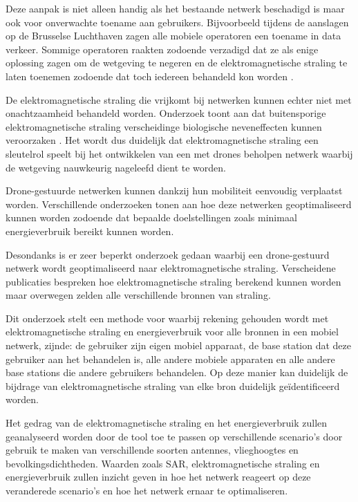 \documentclass[twocolumn]{phdsymp} %
\begin{document}
Deze aanpak is niet alleen handig als het bestaande netwerk beschadigd is maar ook voor onverwachte toename aan gebruikers.
Bijvoorbeeld tijdens de aanslagen op de Brusselse Luchthaven zagen alle mobiele operatoren een toename in data verkeer.
Sommige operatoren raakten zodoende verzadigd dat ze als enige oplossing zagen om de wetgeving te negeren en de 
elektromagnetische straling te laten toenemen zodoende dat toch iedereen behandeld kon worden \cite{baseZaventem}.

De elektromagnetische straling die vrijkomt bij netwerken kunnen echter niet met onachtzaamheid behandeld worden.
Onderzoek toont aan dat buitensporige elektromagnetische straling verscheidinge biologische neveneffecten kunnen veroorzaken \cite{bioeffects,WHO}.
Het wordt dus duidelijk dat elektromagnetische straling een sleutelrol speelt bij het ontwikkelen van een met drones beholpen netwerk 
waarbij de wetgeving nauwkeurig nageleefd dient te worden.

Drone-gestuurde netwerken kunnen dankzij hun mobiliteit eenvoudig verplaatst worden. Verschillende onderzoeken 
tonen aan hoe deze netwerken geoptimaliseerd kunnen worden zodoende dat bepaalde doelstellingen zoals minimaal energieverbruik
bereikt kunnen worden.

Desondanks is er zeer beperkt onderzoek gedaan waarbij een drone-gestuurd netwerk wordt geoptimaliseerd naar elektromagnetische straling.
Verscheidene publicaties bespreken hoe elektromagnetische straling berekend kunnen worden maar 
overwegen zelden alle verschillende bronnen van straling.

Dit onderzoek stelt een methode voor waarbij rekening gehouden wordt met 
elektromagnetische straling en energieverbruik voor alle bronnen in een mobiel netwerk, zijnde: de gebruiker zijn eigen 
mobiel apparaat, de base station dat deze gebruiker aan het behandelen is, alle andere mobiele apparaten en 
alle andere base stations die andere gebruikers behandelen. Op deze manier kan duidelijk de bijdrage van elektromagnetische straling
 van elke bron duidelijk geïdentificeerd worden. 

Het gedrag van de elektromagnetische straling en het energieverbruik zullen geanalyseerd worden door de 
tool toe te passen op verschillende scenario's door gebruik te maken van verschillende soorten antennes, vlieghoogtes 
en bevolkingsdichtheden.
Waarden zoals \gls{SAR}, elektromagnetische straling en energieverbruik zullen inzicht 
geven in hoe het netwerk reageert op deze veranderede scenario's en hoe het netwerk 
ernaar te optimaliseren.
\end{document}
